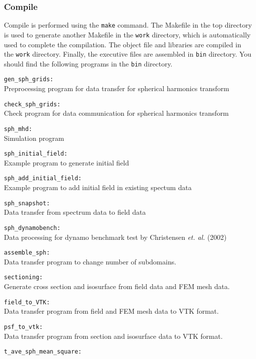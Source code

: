 \subsubsection{Compile}
Compile is performed using the {\tt make} command. The Makefile in the top directory is used to generate another Makefile in the {\tt work} directory, which is automatically used to complete the compilation. The object file and libraries are compiled in the {\tt work} directory. Finally, the executive files are assembled in {\tt bin} directory. You should find the following programs in the {\tt bin} directory.
%
\begin{description}
\item{\tt gen\_sph\_grids:    }\\
 Preprocessing program for data transfer for spherical harmonics transform
\item{\tt check\_sph\_grids:    }\\
 Check program for data communication for spherical harmonics transform
\item{\tt sph\_mhd:          }\\
 Simulation program
\item{\tt sph\_initial\_field: }\\
 Example program to generate initial field
\item{\tt sph\_add\_initial\_field: }\\
 Example program to add initial field in existing spectum data
\item{\tt sph\_snapshot:     }\\
 Data transfer from spectrum data to field data
\item{\tt sph\_dynamobench:  }\\
 Data processing for dynamo benchmark test by Christensen {\it et. al.} (2002)
\item{\tt assemble\_sph:     }\\
 Data transfer program to change number of subdomains.
\item{\tt sectioning:     }\\
 Generate cross section and isosurface from field data and FEM mesh data.
\item{\tt field\_to\_VTK:   }\\
 Data transfer program from field and FEM mesh data to VTK format.
\item{\tt psf\_to\_vtk:     }\\
 Data transfer program from section and isosurface data to VTK format.
\item{\tt t\_ave\_sph\_mean\_square:     }\\

\end{description}
